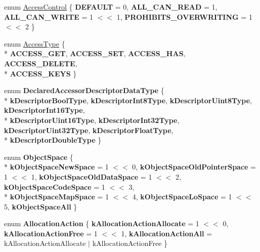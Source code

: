 \begin{DoxyCompactItemize}
\item 
enum \hyperlink{namespacev8_a31d8355cb043d7d2dda3f4a52760b64e}{Access\+Control} \{ {\bfseries D\+E\+F\+A\+U\+L\+T} = 0, 
{\bfseries A\+L\+L\+\_\+\+C\+A\+N\+\_\+\+R\+E\+A\+D} = 1, 
{\bfseries A\+L\+L\+\_\+\+C\+A\+N\+\_\+\+W\+R\+I\+T\+E} = 1 $<$$<$ 1, 
{\bfseries P\+R\+O\+H\+I\+B\+I\+T\+S\+\_\+\+O\+V\+E\+R\+W\+R\+I\+T\+I\+N\+G} = 1 $<$$<$ 2
 \}
\item 
enum \hyperlink{namespacev8_add8bef6469c5b94706584124e610046c}{Access\+Type} \{ \\*
{\bfseries A\+C\+C\+E\+S\+S\+\_\+\+G\+E\+T}, 
{\bfseries A\+C\+C\+E\+S\+S\+\_\+\+S\+E\+T}, 
{\bfseries A\+C\+C\+E\+S\+S\+\_\+\+H\+A\+S}, 
{\bfseries A\+C\+C\+E\+S\+S\+\_\+\+D\+E\+L\+E\+T\+E}, 
\\*
{\bfseries A\+C\+C\+E\+S\+S\+\_\+\+K\+E\+Y\+S}
 \}
\item 
\hypertarget{namespacev8_a47404d60b87c3c91bc10d46f1ff871ff}{}enum {\bfseries Declared\+Accessor\+Descriptor\+Data\+Type} \{ \\*
{\bfseries k\+Descriptor\+Bool\+Type}, 
{\bfseries k\+Descriptor\+Int8\+Type}, 
{\bfseries k\+Descriptor\+Uint8\+Type}, 
{\bfseries k\+Descriptor\+Int16\+Type}, 
\\*
{\bfseries k\+Descriptor\+Uint16\+Type}, 
{\bfseries k\+Descriptor\+Int32\+Type}, 
{\bfseries k\+Descriptor\+Uint32\+Type}, 
{\bfseries k\+Descriptor\+Float\+Type}, 
\\*
{\bfseries k\+Descriptor\+Double\+Type}
 \}\label{namespacev8_a47404d60b87c3c91bc10d46f1ff871ff}

\item 
\hypertarget{namespacev8_ae7bc5b0bd1100e94d78de255daa8ebc3}{}enum {\bfseries Object\+Space} \{ \\*
{\bfseries k\+Object\+Space\+New\+Space} = 1 $<$$<$ 0, 
{\bfseries k\+Object\+Space\+Old\+Pointer\+Space} = 1 $<$$<$ 1, 
{\bfseries k\+Object\+Space\+Old\+Data\+Space} = 1 $<$$<$ 2, 
{\bfseries k\+Object\+Space\+Code\+Space} = 1 $<$$<$ 3, 
\\*
{\bfseries k\+Object\+Space\+Map\+Space} = 1 $<$$<$ 4, 
{\bfseries k\+Object\+Space\+Lo\+Space} = 1 $<$$<$ 5, 
{\bfseries k\+Object\+Space\+All}
 \}\label{namespacev8_ae7bc5b0bd1100e94d78de255daa8ebc3}

\item 
\hypertarget{namespacev8_ae2b70dd2abba164d9ad9ffc9f757eca9}{}enum {\bfseries Allocation\+Action} \{ {\bfseries k\+Allocation\+Action\+Allocate} = 1 $<$$<$ 0, 
{\bfseries k\+Allocation\+Action\+Free} = 1 $<$$<$ 1, 
{\bfseries k\+Allocation\+Action\+All} = k\+Allocation\+Action\+Allocate $\vert$ k\+Allocation\+Action\+Free
 \}\label{namespacev8_ae2b70dd2abba164d9ad9ffc9f757eca9}


\end{DoxyCompactItemize}
